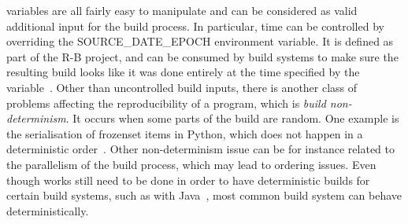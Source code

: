 \documentclass[a4paper,11pt,oneside]{report}
\theoremstyle{definition}
\newcommand{\sde}{SOURCE\_DATE\_EPOCH\xspace}
\begin{document}
variables are all fairly easy to manipulate and can be considered as valid
additional input for the build process. In particular, time can be controlled
by overriding the \sde environment variable. It is defined as part of the R-B
project, and can be consumed by build systems to make sure the resulting build
looks like it was done entirely at the time specified by the variable~\cite{rb:sde}.
Other than uncontrolled build inputs, there is another class of problems
affecting the reproducibility of a program, which is \emph{build
non-determinism}. It occurs when some parts of the build are random. One example
is the serialisation of frozenset items in Python, which does not happen in a
deterministic order~\cite{gh:pyc-frozenset}. Other non-determinism issue can be
for instance related to the parallelism of the build process, which may lead to
ordering issues. Even though works still need to be done in order to have
deterministic builds for certain build systems, such as with
Java~\cite{xiong2022towards}, most common build system can behave
deterministically.
\end{document}
